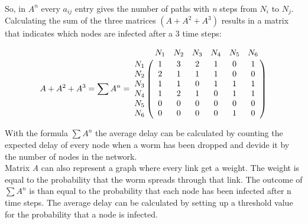 ~~\\
So, in $A^{n}$ every $a_{ij}$ entry gives the number of paths with \textit{n} steps from $N_{i}$ to $N_{j}$.\\

Calculating the sum of the three matrices $(A + A^{2} + A^{3}) $ results in a matrix that indicates which nodes are infected after a 3 time steps:

\begin{equation}
 A + A^{2} + A^{3} = \sum A^{n} =
\bordermatrix{
         & N_1		& N_2	& N_3	& N_4 	& N_5	&N_6     \cr
    N_1   & 1		& 3		& 2		& 1		& 0		& 1	     \cr
    N_2   & 2		& 1		& 1		& 1		& 0		& 0	     \cr
    N_3   & 1		& 1		& 0		& 1		& 1		& 1	     \cr
    N_4   & 1		& 2		& 1		& 0		& 1		& 1	     \cr
	N_5   & 0		& 0		& 0		& 0		& 0		& 0	     \cr
	N_6   & 0		& 0		& 0		& 0		& 1		& 0	     \cr
}
\end{equation}

With the formula $\sum A^{n}$ the average delay can be calculated by counting the expected delay of every node when a worm has been dropped and devide it by the number of nodes in the network. \\

Matrix \textit{A} can also represent a graph where every link get a weight. The weight is equal to the probability that the worm spreads through that link. The outcome of $ \sum A^{n}$ is than equal to the probability that each node has been infected after n time steps. The average delay can be calculated by setting up a threshold value for the probability that a node is infected. \\

